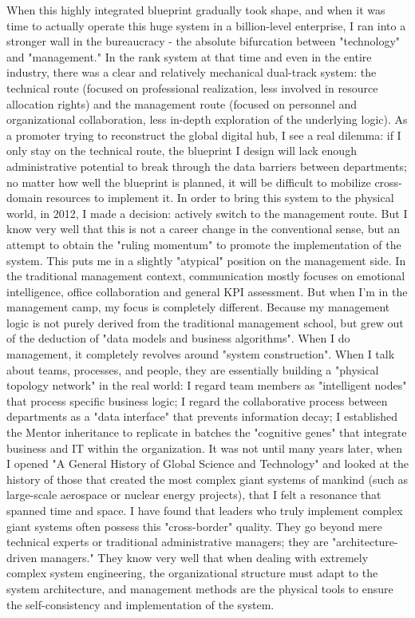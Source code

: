 \documentclass[11pt,a4paper]{article}
\begin{document}
When this highly integrated blueprint gradually took shape, and when it was time to actually operate this huge system in a billion-level enterprise, I ran into a stronger wall in the bureaucracy - the absolute bifurcation between "technology" and "management." In the rank system at that time and even in the entire industry, there was a clear and relatively mechanical dual-track system: the technical route (focused on professional realization, less involved in resource allocation rights) and the management route (focused on personnel and organizational collaboration, less in-depth exploration of the underlying logic). As a promoter trying to reconstruct the global digital hub, I see a real dilemma: if I only stay on the technical route, the blueprint I design will lack enough administrative potential to break through the data barriers between departments; no matter how well the blueprint is planned, it will be difficult to mobilize cross-domain resources to implement it. In order to bring this system to the physical world, in 2012, I made a decision: actively switch to the management route. But I know very well that this is not a career change in the conventional sense, but an attempt to obtain the "ruling momentum" to promote the implementation of the system. This puts me in a slightly "atypical" position on the management side. In the traditional management context, communication mostly focuses on emotional intelligence, office collaboration and general KPI assessment. But when I'm in the management camp, my focus is completely different. Because my management logic is not purely derived from the traditional management school, but grew out of the deduction of "data models and business algorithms". When I do management, it completely revolves around "system construction". When I talk about teams, processes, and people, they are essentially building a "physical topology network" in the real world: I regard team members as "intelligent nodes" that process specific business logic; I regard the collaborative process between departments as a "data interface" that prevents information decay; I established the Mentor inheritance to replicate in batches the "cognitive genes" that integrate business and IT within the organization. It was not until many years later, when I opened "A General History of Global Science and Technology" and looked at the history of those that created the most complex giant systems of mankind (such as large-scale aerospace or nuclear energy projects), that I felt a resonance that spanned time and space. I have found that leaders who truly implement complex giant systems often possess this "cross-border" quality. They go beyond mere technical experts or traditional administrative managers; they are "architecture-driven managers." They know very well that when dealing with extremely complex system engineering, the organizational structure must adapt to the system architecture, and management methods are the physical tools to ensure the self-consistency and implementation of the system.
\end{document}
